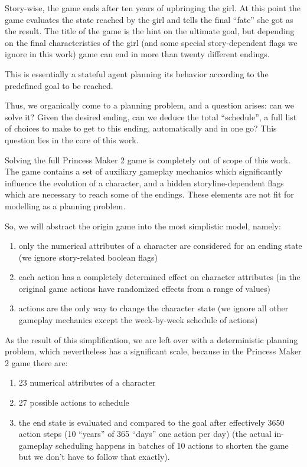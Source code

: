 \documentclass[12pt, a4paper]{report}
\begin{document}
	Story-wise, the game ends after ten years of upbringing the girl.
	At this point the game evaluates the state reached by the girl and tells the final ``fate'' she got as the result.
	The title of the game is the hint on the ultimate goal, but depending on the final characteristics of the girl (and some special story-dependent flags we ignore in this work) game can end in more than twenty different endings.
		
	This is essentially a stateful agent planning its behavior according to the predefined goal to be reached.
	
	Thus, we organically come to a planning problem, and a question arises: can we solve it? Given the desired ending, can we deduce the total ``schedule'', a full list of choices to make to get to this ending, automatically and in one go? This question lies in the core of this work.
	
	Solving the full Princess Maker 2 game is completely out of scope of this work.
	The game contains a set of auxiliary gameplay mechanics which significantly influence the evolution of a character, and a hidden storyline-dependent flags which are necessary to reach some of the endings.
	These elements are not fit for modelling as a planning problem.
	
	So, we will abstract the origin game into the most simplistic model, namely:
	
	\begin{enumerate}
		\item only the numerical attributes of a character are considered for an ending state (we ignore story-related boolean flags)
		\item each action has a completely determined effect on character attributes (in the original game actions have randomized effects from a range of values)
		\item actions are the only way to change the character state (we ignore all other gameplay mechanics except the week-by-week schedule of actions)
	\end{enumerate}

	As the result of this simplification, we are left over with a deterministic planning problem, which nevertheless has a significant scale, because in the Princess Maker 2 game there are:
	
	\begin{enumerate}
		\item 23 numerical attributes of a character
		\item 27 possible actions to schedule
		\item the end state is evaluated and compared to the goal after effectively 3650 action steps (10 ``years'' of 365 ``days'' one action per day) (the actual in-gameplay scheduling happens in batches of 10 actions to shorten the game but we don't have to follow that exactly).
	\end{enumerate}
\end{document}
